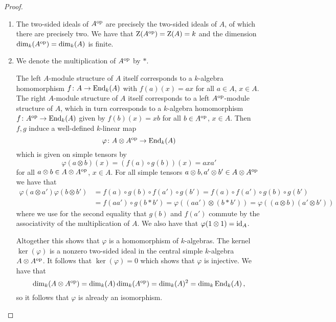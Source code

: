 \begin{proof}
  \leavevmode
  \begin{enumerate}
    \item
      The two-sided ideals of $A^{\mathrm{op}}$ are precisely the two-sided ideals of $A$, of which there are precisely two.
      We have that $\operatorname{Z}(A^{\mathrm{op}}) = \operatorname{Z}(A) = k$ and the dimension $\dim_k(A^{\mathrm{op}}) = \dim_k(A)$ is finite.
    \item
      We denote the multiplication of $A^{\mathrm{op}}$ by $*$.
      
      The left $A$-module structure of $A$ itself corresponds to a $k$-algebra homomorphism $f \colon A \to \operatorname{End}_k(A)$ with $f(a)(x) = ax$ for all $a \in A$, $x \in A$.
      The right $A$-module structure of $A$ itself corresponds to a left $A^{\mathrm{op}}$-module structure of $A$, which in turn corresponds to a $k$-algebra homomorphism $f \colon A^{\mathrm{op}} \to \operatorname{End}_k(A)$ given by $f(b)(x) = xb$ for all $b \in A^{\mathrm{op}}$, $x \in A$.
      Then $f, g$ induce a well-defined $k$-linear map
      \[
                \varphi
        \colon  A \otimes A^{\mathrm{op}}
        \to     \operatorname{End}_k(A)
      \]
      which is given on simple tensors by
      \[
          \varphi(a \otimes b)(x)
        = (f(a) \circ g(b))(x)
        = a x a'
      \]
      for all $a \otimes b \in A \otimes A^{\mathrm{op}}$, $x \in A$.
      For all simple tensors $a \otimes b, a' \otimes b' \in A \otimes A^{\mathrm{op}}$ we have that
      \begin{align*}
            \varphi(a \otimes a') \varphi(b \otimes b')
        &=  f(a) \circ g(b) \circ f(a') \circ g(b')
         =  f(a) \circ f(a') \circ g(b) \circ g(b') \\
        &=  f(a a') \circ g(b * b')
         =  \varphi((a a') \otimes (b * b'))
         =  \varphi((a \otimes b) (a' \otimes b'))
      \end{align*}
      where we use for the second equality that $g(b)$ and $f(a')$ commute by the associativity of the multiplication of $A$.
      We also have that $\varphi(1 \otimes 1) = \operatorname{id}_A$.
      
      Altogether this shows that $\varphi$ is a homomorphism of $k$-algebras.
      The kernel $\ker(\varphi)$ is a nonzero two-sided ideal in the central simple $k$-algebra $A \otimes A^{\mathrm{op}}$.
      It follows that $\ker(\varphi) = 0$ which shows that $\varphi$ is injective.
      We have that
      \[
          \dim_k (A \otimes A^{\mathrm{op}})
        = \dim_k(A) \dim_k(A^{\mathrm{op}})
        = \dim_k(A)^2
        = \dim_k \operatorname{End}_k(A) \,,
      \]
      so it follows that $\varphi$ is already an isomorphism.
    \qedhere
  \end{enumerate}
\end{proof}


